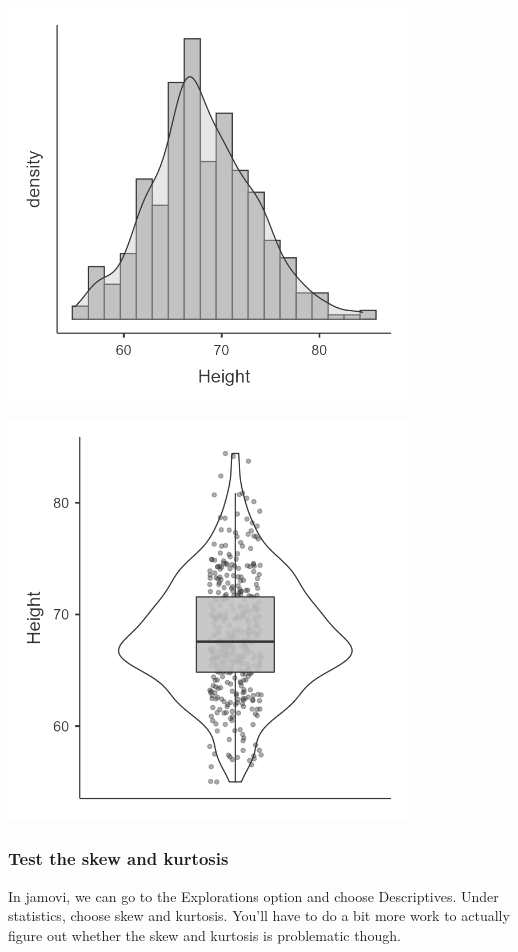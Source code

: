 \documentclass[
]{book}
\begin{document}
\includegraphics[width=4.16667in,height=\textheight]{images/06-inferential/histogram.png}

\includegraphics[width=4.16667in,height=\textheight]{images/06-inferential/boxplot.png}

\hypertarget{test-the-skew-and-kurtosis}{%
\subsubsection{Test the skew and kurtosis}\label{test-the-skew-and-kurtosis}}

In jamovi, we can go to the Explorations option and choose Descriptives. Under statistics, choose skew and kurtosis. You'll have to do a bit more work to actually figure out whether the skew and kurtosis is problematic though.
\end{document}
